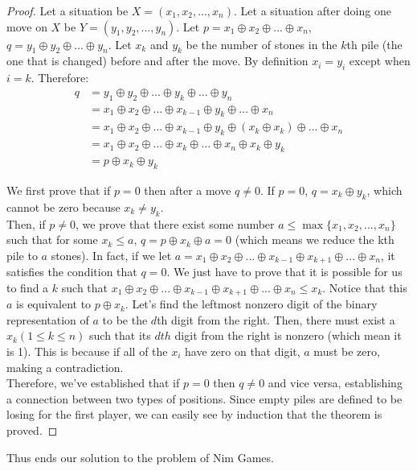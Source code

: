 		\begin{proof}
		Let a situation be $X = (x_1,x_2,...,x_n)$. Let a situation after doing one move on $X$ be $Y = (y_1,y_2,...,y_n)$. Let $p = x_1 \oplus x_2 \oplus... \oplus x_n$, $ q = y_1 \oplus y_2 \oplus ... \oplus y_n$. Let $x_k$ and $y_k$ be the number of stones in the $k$th pile (the one that is changed) before and after the move.  By definition $x_i = y_i$ except when $i=k$. Therefore:
		\begin{align}
		\nonumber q &= y_1 \oplus y_2 \oplus ... \oplus y_k \oplus ... \oplus y_n\\
		\nonumber   &= x_1 \oplus x_2 \oplus ... \oplus x_{k-1} \oplus y_k \oplus ... \oplus x_n\\
		\nonumber   &= x_1 \oplus x_2 \oplus ... \oplus x_{k-1} \oplus y_k \oplus (x_k \oplus x_k) \oplus ... \oplus x_n\\
		\nonumber   &= x_1 \oplus x_2 \oplus ... \oplus x_k \oplus ... \oplus x_n \oplus x_k \oplus y_k\\
		\nonumber   &= p \oplus x_k \oplus y_k
		\end{align}
		
		\indent We first prove that if $p=0$ then after a move $q\neq0$. If $p=0$, $q=x_k \oplus y_k$, which cannot be zero because $x_k \neq y_k$.\\
		\indent Then, if $p\neq0$, we prove that there exist some number $a \leq \max\{x_1,x_2,...,x_n\}$ such that for some $x_k \leq a$, $q = p \oplus x_k \oplus a = 0$ (which means we reduce the kth pile to $a$ stones). In fact, if we let $a = x_1 \oplus x_2 \oplus ... \oplus x_{k-1} \oplus x_{k+1} \oplus ... \oplus x_n$, it satisfies the condition that $q = 0$. We just have to prove that it is possible for us to find a $k$ such that $x_1 \oplus x_2 \oplus ... \oplus x_{k-1} \oplus x_{k+1} \oplus ... \oplus x_n \leq x_k$. Notice that this $a$ is equivalent to $p \oplus x_k$. Let's find the leftmost nonzero digit of the binary representation of $a$ to be the $d$th digit from the right. Then, there must exist a $x_k (1\leq k\leq n)$ such that its $dth$ digit from the right is nonzero (which mean it is 1). This is because if all of the $x_i$ have zero on that digit, $a$ must be zero, making a contradiction.\\
		\indent Therefore, we've established that if $p=0$ then $q\neq0$ and vice versa, establishing a connection between two types of positions. Since empty piles are defined to be losing for the first player, we can easily see by induction that the theorem is proved.
		\end{proof}
		Thus ends our solution to the problem of Nim Games.

